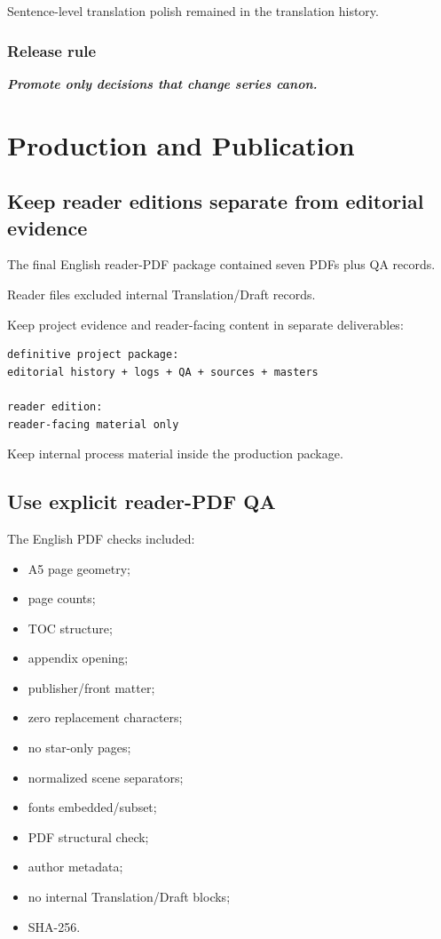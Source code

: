 \documentclass[11pt,oneside,openany]{book}
\renewenvironment{quote}{\begin{insightbox}\itshape}{\end{insightbox}}
\providecommand{\tightlist}{%
  \setlength{\itemsep}{0pt}\setlength{\parskip}{0pt}}
\begin{document}
Sentence-level translation polish remained in the translation history.

\section{Release rule}\label{release-rule}

\begin{quote}
\textbf{Promote only decisions that change series canon.}
\end{quote}

\part{Production and Publication}

\chapter{Keep reader editions separate from editorial evidence}\label{keep-reader-editions-separate-from-editorial-evidence}

The final English reader-PDF package contained seven PDFs plus QA records.

Reader files excluded internal Translation/Draft records.

Keep project evidence and reader-facing content in separate deliverables:

\begin{lstlisting}
definitive project package:
editorial history + logs + QA + sources + masters

reader edition:
reader-facing material only
\end{lstlisting}

Keep internal process material inside the production package.

\chapter{Use explicit reader-PDF QA}

The English PDF checks included:

\begin{itemize}
\tightlist
\item
  A5 page geometry;
\item
  page counts;
\item
  TOC structure;
\item
  appendix opening;
\item
  publisher/front matter;
\item
  zero replacement characters;
\item
  no star-only pages;
\item
  normalized scene separators;
\item
  fonts embedded/subset;
\item
  PDF structural check;
\item
  author metadata;
\item
  no internal Translation/Draft blocks;
\item
  SHA-256.
\end{itemize}
\end{document}
